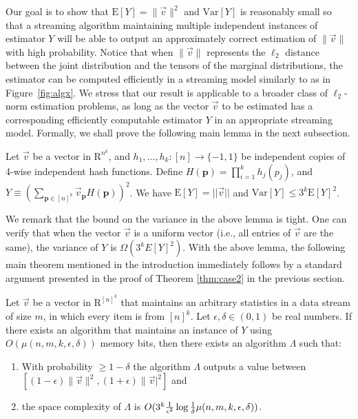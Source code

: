\def\draft{0}  \documentclass[proceedings]{stacs}
\theoremstyle{plain}\newtheorem{satz}[thm]{Satz}
\theoremstyle{definition}\newtheorem{crucial}[thm]{Crucial Definition}
\newcommand{\vecv}{{\vec{v}} }
\newcommand{\bfp}{{\mathbf p} }
\newcommand{\Var}{{\mathrm{Var}} }
\newcommand{\E}{{\mathrm{E}} }
\begin{document}
Our goal is to show that $\mathrm E[Y] = \|\vec v\|^2$ and $\mathrm{Var}[Y]$ is reasonably small so that a streaming algorithm maintaining multiple independent instances of estimator $Y$ will be able to output an approximately correct estimation of $\|\vecv\|$ with high probability. Notice that when $\|\vecv\|$ represents the $\ell_2$ distance between the joint distribution and the tensors of the marginal distributions, the estimator can be computed efficiently in a streaming model similarly to as in  Figure~\ref{fig:algx}. We stress that our result is applicable to a broader class of $\ell_2$-norm estimation problems, as long as the vector $\vecv$ to be estimated has a corresponding efficiently computable estimator $Y$ in an appropriate streaming model. Formally, we shall prove the following main lemma in the next subsection.



\begin{lemma} \label{lem:main_lemma} Let $\vecv $ be a vector in $\mathrm R^{n^k}$, and $h_1,\dots,h_k:[n] \rightarrow \{-1, 1\}$ be independent copies of 4-wise independent hash functions. Define $H(\bfp) = \prod_{i =1}^k h_j(p_j)$, and $Y \equiv \left(\sum_{\bfp \in [n]^k}\vec v_{\bfp}H(\bfp)\right)^2$. We have $\E[Y] = ||\vecv||$ and $\Var[Y] \leq 3^k \E[Y]^2$.
\end{lemma}

We remark that the bound on the variance in the above lemma is tight. One can verify that when the vector $\vecv$ is a uniform vector (i.e., all entries of $\vecv$ are the same), the variance of $Y$ is $\Omega(3^k E[Y]^2)$. With the above lemma, the following main theorem mentioned in the introduction immediately follows by a standard argument presented in the proof of Theorem \ref{thm:case2} in the previous section.

\begin{theorem}\label{tm:main1}
Let $\vec v$ be a vector in $\mathrm R^{[n]^k}$ that maintains an arbitrary statistics in a data stream of size $m$, in which every item is from $[n]^k$. Let $\epsilon,\delta \in (0,1)$ be real numbers. If there exists an algorithm that maintains an instance of $Y$ using $O(\mu(n,m,k, \epsilon, \delta))$ memory bits, then
there exists an algorithm $\Lambda$ such that:
\begin{enumerate}
\item With probability $\geq 1 - \delta$ the algorithm $\Lambda$ outputs a value between $[(1-\epsilon)\|\vecv\|^2, (1+\epsilon)\|\vecv|^2]$ and
\item the space complexity of $\Lambda$ is $O(3^k{1\over \epsilon^2}\log{1\over \delta}\mu(n,m,k, \epsilon, \delta))$.
\end{enumerate}
\end{theorem}
\end{document}
